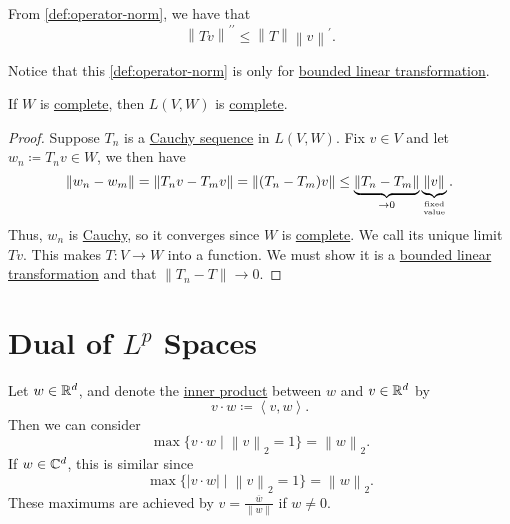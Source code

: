 \begin{prev}
	From \autoref{def:operator-norm}, we have that
	\[
		\left\lVert Tv\right\rVert ^{\prime\prime} \leq \left\lVert T\right\rVert \left\lVert v\right\rVert ^\prime .
	\]
\end{prev}

\begin{remark}
	Notice that this \autoref{def:operator-norm} is only for \hyperref[def:bounded-linear-transformation]{bounded linear transformation}.
\end{remark}

\begin{theorem}\label{thm:blts-complete}
	If \(W\) is \hyperref[def:complete]{complete}, then \(L(V,W)\) is \hyperref[def:complete]{complete}.
\end{theorem}

\begin{proof}
	Suppose \(T_n\) is a \hyperref[def:Cauchy-sequence]{Cauchy sequence} in \(L(V,W)\). Fix \(v \in V\) and let \(w_n \coloneqq T_n v \in W\), we then have
	\[
		\left\lVert w_n - w_m\right\rVert = \left\lVert T_n v - T_m v\right\rVert = \left\lVert (T_n - T_m)v\right\rVert
		\leq \underbrace{\left\lVert T_n - T_m\right\rVert}_{\to 0} \underbrace{\left\lVert v\right\rVert}_{\text{fixed}\atop \text{value}}.
	\]
	Thus, \(w_n\) is \hyperref[def:Cauchy-sequence]{Cauchy}, so it converges since \(W\) is \hyperref[def:complete]{complete}. We call its unique
	limit \(Tv\). This makes \(T \colon V \to W\) into a function. We must show it is a \hyperref[def:bounded-linear-transformation]{bounded linear transformation} and that
	\(\left\lVert T_n - T\right\rVert \to 0\).
\end{proof}

\section{Dual of \(L^p\) Spaces}
\begin{eg}
	Let \(w \in \mathbb{\MakeUppercase{r}} ^d\), and denote the \hyperref[def:inner-product]{inner product} between \(w\) and \(v\in \mathbb{\MakeUppercase{r}} ^d\) by
	\[
		v\cdot w \coloneqq \left< v, w \right>.
	\]
	Then we can consider
	\[
		\max\{v \cdot w \mid \left\lVert v\right\rVert_2 = 1\} = \left\lVert w\right\rVert_2.
	\]
	If \(w \in \mathbb{\MakeUppercase{c}}^d\), this is similar since
	\[
		\max\{\left\vert v \cdot w \right\vert  \mid \left\lVert v\right\rVert_2 = 1\} = \left\lVert w\right\rVert_2.
	\]
	These maximums are achieved by \(v = \frac{\overline{w} }{\left\lVert w\right\rVert}\) if \(w \neq 0\).
\end{eg}

